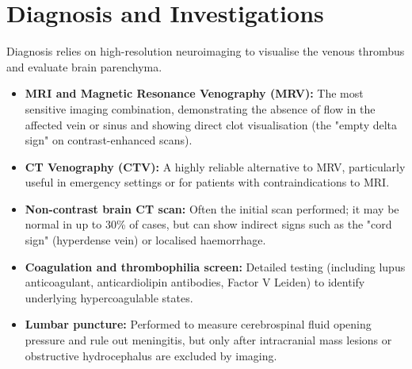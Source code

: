 \section*{Diagnosis and Investigations}
Diagnosis relies on high-resolution neuroimaging to visualise the venous thrombus and evaluate brain parenchyma.
\begin{itemize}
    \item \textbf{MRI and Magnetic Resonance Venography (MRV):} The most sensitive imaging combination, demonstrating the absence of flow in the affected vein or sinus and showing direct clot visualisation (the "empty delta sign" on contrast-enhanced scans).
    \item \textbf{CT Venography (CTV):} A highly reliable alternative to MRV, particularly useful in emergency settings or for patients with contraindications to MRI.
    \item \textbf{Non-contrast brain CT scan:} Often the initial scan performed; it may be normal in up to 30\% of cases, but can show indirect signs such as the "cord sign" (hyperdense vein) or localised haemorrhage.
    \item \textbf{Coagulation and thrombophilia screen:} Detailed testing (including lupus anticoagulant, anticardiolipin antibodies, Factor V Leiden) to identify underlying hypercoagulable states.
    \item \textbf{Lumbar puncture:} Performed to measure cerebrospinal fluid opening pressure and rule out meningitis, but only after intracranial mass lesions or obstructive hydrocephalus are excluded by imaging.
\end{itemize}

